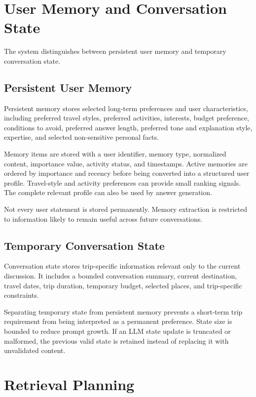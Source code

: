 \section{User Memory and Conversation State}

The system distinguishes between persistent user memory and temporary
conversation state.

\subsection{Persistent User Memory}

Persistent memory stores selected long-term preferences and user
characteristics, including preferred travel styles, preferred activities,
interests, budget preference, conditions to avoid, preferred answer length,
preferred tone and explanation style, expertise, and selected non-sensitive
personal facts.

Memory items are stored with a user identifier, memory type, normalized
content, importance value, activity status, and timestamps. Active memories are
ordered by importance and recency before being converted into a structured
user profile. Travel-style and activity preferences can provide small ranking
signals. The complete relevant profile can also be used by answer generation.

Not every user statement is stored permanently. Memory extraction is
restricted to information likely to remain useful across future conversations.

\subsection{Temporary Conversation State}

Conversation state stores trip-specific information relevant only to the
current discussion. It includes a bounded conversation summary, current
destination, travel dates, trip duration, temporary budget, selected places,
and trip-specific constraints.

Separating temporary state from persistent memory prevents a short-term trip
requirement from being interpreted as a permanent preference. State size is
bounded to reduce prompt growth. If an LLM state update is truncated or
malformed, the previous valid state is retained instead of replacing it with
unvalidated content.

\section{Retrieval Planning}

